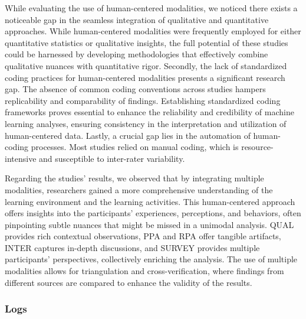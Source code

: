 \documentclass[manuscript,screen,review]{acmart}
\begin{document}
While evaluating the use of human-centered modalities, we noticed there exists a noticeable gap in the seamless integration of qualitative and quantitative approaches. While human-centered modalities were frequently employed for either quantitative statistics or qualitative insights, the full potential of these studies could be harnessed by developing methodologies that effectively combine qualitative nuances with quantitative rigor. Secondly, the lack of standardized coding practices for human-centered modalities presents a significant research gap. The absence of common coding conventions across studies hampers replicability and comparability of findings. Establishing standardized coding frameworks proves essential to enhance the reliability and credibility of machine learning analyses, ensuring consistency in the interpretation and utilization of human-centered data. Lastly, a crucial gap lies in the automation of human-coding processes. Most studies relied on manual coding, which is resource-intensive and susceptible to inter-rater variability.

Regarding the studies' results, we observed that by integrating multiple modalities, researchers gained a more comprehensive understanding of the learning environment and the learning activities. This human-centered approach offers insights into the participants' experiences, perceptions, and behaviors, often pinpointing subtle nuances that might be missed in a unimodal analysis. QUAL provides rich contextual observations, PPA and RPA offer tangible artifacts, INTER captures in-depth discussions, and SURVEY provides multiple participants' perspectives, collectively enriching the analysis. The use of multiple modalities allows for triangulation and cross-verification, where findings from different sources are compared to enhance the validity of the results.
    
\subsubsection{Logs}\label{subsubsec:logs}
\end{document}

